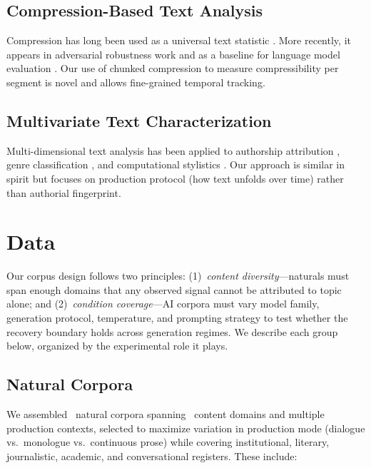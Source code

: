 \documentclass[11pt]{article}
\begin{document}
\subsection{Compression-Based Text Analysis}

Compression has long been used as a universal text statistic \citep{teahan2003using,benedetto2002language}. More recently, it appears in adversarial robustness work \citep{holtzman2021surface} and as a baseline for language model evaluation \citep{ussishkin2023compression}. Our use of chunked compression to measure compressibility per segment is novel and allows fine-grained temporal tracking.

\subsection{Multivariate Text Characterization}

Multi-dimensional text analysis has been applied to authorship attribution \citep{stamatatos2009survey}, genre classification \citep{kessler1997automatic}, and computational stylistics \citep{hoover2013quantitative}. Our approach is similar in spirit but focuses on production protocol (how text unfolds over time) rather than authorial fingerprint.


\section{Data}

Our corpus design follows two principles: (1)~\textit{content diversity}---naturals must span enough domains that any observed signal cannot be attributed to topic alone; and (2)~\textit{condition coverage}---AI corpora must vary model family, generation protocol, temperature, and prompting strategy to test whether the recovery boundary holds across generation regimes. We describe each group below, organized by the experimental role it plays.

\subsection{Natural Corpora}

We assembled \nNatural\ natural corpora spanning \nDomains\ content domains and multiple production contexts, selected to maximize variation in production mode (dialogue vs.\ monologue vs.\ continuous prose) while covering institutional, literary, journalistic, academic, and conversational registers. These include:
\end{document}
